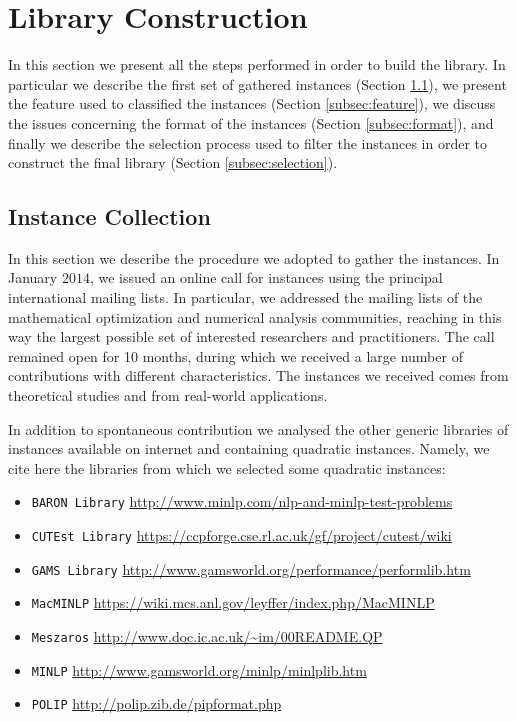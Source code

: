 \section{Library Construction}\label{sec:lib}

In this section we present all the steps performed in order to build
the library. In particular we describe the first set of gathered
instances (Section \ref{subsec:instColl}),
we present the feature used to classified the instances (Section
\ref{subsec:feature}),
we discuss the issues concerning the format of the instances (Section
\ref{subsec:format}),  and finally we describe the selection process
used to filter the instances in order to construct the final library
(Section \ref{subsec:selection}).

\subsection{Instance Collection}\label{subsec:instColl}

In this section we describe the procedure we adopted to gather the
instances. In January $2014$, we issued an online call for instances
using the principal international mailing lists.
In particular, we addressed the mailing lists of the mathematical
optimization and numerical analysis communities, reaching in this way
the largest possible set of interested researchers and practitioners.
The call remained open for 10 months, during which we received a large
number of contributions with different characteristics. The instances
we received  comes from theoretical studies and from real-world
applications.

In addition to spontaneous contribution we analysed the other generic
libraries of instances available  on internet and containing quadratic
instances. Namely, we cite here the libraries from which we selected
some quadratic instances:

\begin{itemize}
 \item {\tt BARON Library}
\url{http://www.minlp.com/nlp-and-minlp-test-problems}
 \item {\tt CUTEst Library}
\url{https://ccpforge.cse.rl.ac.uk/gf/project/cutest/wiki}
 \item {\tt GAMS Library}
\url{http://www.gamsworld.org/performance/performlib.htm}
 \item {\tt MacMINLP} \url{https://wiki.mcs.anl.gov/leyffer/index.php/MacMINLP}
 \item {\tt Meszaros} \url{http://www.doc.ic.ac.uk/~im/00README.QP}
 \item {\tt MINLP} \url{http://www.gamsworld.org/minlp/minlplib.htm}
 \item {\tt POLIP} \url{http://polip.zib.de/pipformat.php}
\end{itemize}

